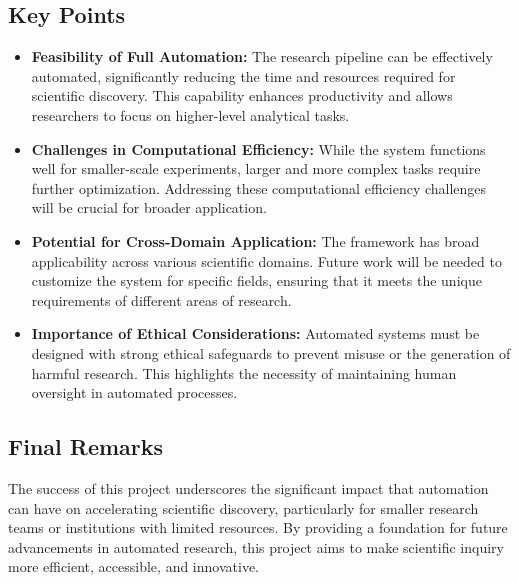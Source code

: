 \subsection{Key Points}
\begin{itemize}
\item \textbf{Feasibility of Full Automation:} The research pipeline can be effectively automated, significantly reducing the time and resources required for scientific discovery. This capability enhances productivity and allows researchers to focus on higher-level analytical tasks.

\item \textbf{Challenges in Computational Efficiency:} While the system functions well for smaller-scale experiments, larger and more complex tasks require further optimization. Addressing these computational efficiency challenges will be crucial for broader application.

\item \textbf{Potential for Cross-Domain Application:} The framework has broad applicability across various scientific domains. Future work will be needed to customize the system for specific fields, ensuring that it meets the unique requirements of different areas of research.

\item \textbf{Importance of Ethical Considerations:} Automated systems must be designed with strong ethical safeguards to prevent misuse or the generation of harmful research. This highlights the necessity of maintaining human oversight in automated processes.
\end{itemize}

\subsection{Final Remarks}
The success of this project underscores the significant impact that automation can have on accelerating scientific discovery, particularly for smaller research teams or institutions with limited resources. By providing a foundation for future advancements in automated research, this project aims to make scientific inquiry more efficient, accessible, and innovative. 